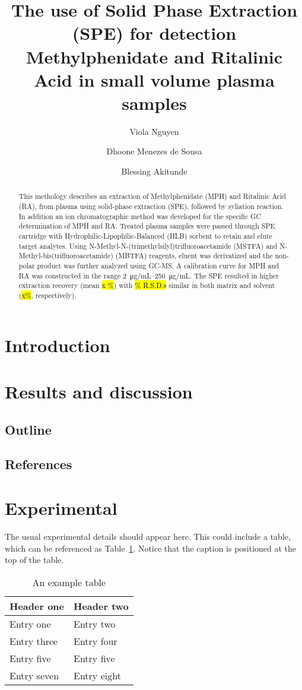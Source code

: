 \documentclass[journal=jacsat,manuscript=article]{achemso}
\author{Viola Nguyen}
\author{Dhoone Menezes de Sousa}
\author{Blessing Akitunde}
\affiliation{Icahn School of Medicine}
\title{The use of Solid Phase Extraction (SPE) for detection Methylphenidate and Ritalinic Acid in small volume plasma samples }
\begin{document}
\begin{abstract}
This methology describes an extraction of Methylphenidate (MPH) and Ritalinic Acid (RA), from plasma using solid-phase extraction (SPE), followed by syliation reaction. In addition an ion chromatographic method was developed for the specific GC determination of MPH and RA.  Treated plasma samples were passed through SPE cartridge with Hydrophilic-Lipophilic-Balanced (HLB) sorbent to retain and elute target analytes. Using N-Methyl-N-(trimethylsilyl)trifluoroacetamide (MSTFA) and N-Methyl-bis(trifluoroacetamide) (MBTFA) reagents, eluent was derivatized and the non-polar product was further analyzed using GC-MS. A calibration curve for MPH and RA was constructed in the range  \SIrange[range-units = brackets]{2}{250}{\micro \gram/mL}. The SPE resulted in higher extraction recovery (mean \hl  {x \%}) with \hl {\% R.S.D.s} similar in both matrix and solvent (\hl {x\%}, respectively).

\end{abstract}

\section{Introduction}


\section{Results and discussion}

\subsection{Outline}



\subsection{References}

\section{Experimental}

The usual experimental details should appear here.  This could
include a table, which can be referenced as Table~\ref{tbl:example}.
Notice that the caption is positioned at the top of the table.
\begin{table}
  \caption{An example table}
  \label{tbl:example}
  \begin{tabular}{ll}
    \hline
    Header one  & Header two  \\
    \hline
    Entry one   & Entry two   \\
    Entry three & Entry four  \\
    Entry five  & Entry five  \\
    Entry seven & Entry eight \\
    \hline
  \end{tabular}
\end{table}
\end{document}
